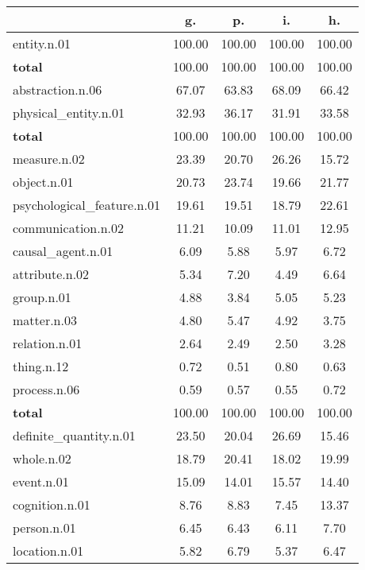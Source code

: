 \begin{table}[h!]
\begin{center}
\begin{tabular}{| l || c | c | c | c |}\hline
 & {\bf g.} & {\bf p.} & {\bf i.} & {\bf h.} \\\hline\hline
entity.n.01 & 100.00  & 100.00  & 100.00  & 100.00 \\\hline\hline
{{\bf total}} & 100.00  & 100.00  & 100.00  & 100.00 \\\hline\hline\hline
abstraction.n.06 & 67.07  & 63.83  & 68.09  & 66.42 \\\hline
physical\_entity.n.01 & 32.93  & 36.17  & 31.91  & 33.58 \\\hline\hline
{{\bf total}} & 100.00  & 100.00  & 100.00  & 100.00 \\\hline\hline\hline
measure.n.02 & 23.39  & 20.70  & 26.26  & 15.72 \\\hline
object.n.01 & 20.73  & 23.74  & 19.66  & 21.77 \\\hline
psychological\_feature.n.01 & 19.61  & 19.51  & 18.79  & 22.61 \\\hline
communication.n.02 & 11.21  & 10.09  & 11.01  & 12.95 \\\hline
causal\_agent.n.01 & 6.09  & 5.88  & 5.97  & 6.72 \\\hline
attribute.n.02 & 5.34  & 7.20  & 4.49  & 6.64 \\\hline
group.n.01 & 4.88  & 3.84  & 5.05  & 5.23 \\\hline
matter.n.03 & 4.80  & 5.47  & 4.92  & 3.75 \\\hline
relation.n.01 & 2.64  & 2.49  & 2.50  & 3.28 \\\hline
thing.n.12 & 0.72  & 0.51  & 0.80  & 0.63 \\\hline
process.n.06 & 0.59  & 0.57  & 0.55  & 0.72 \\\hline\hline
{{\bf total}} & 100.00  & 100.00  & 100.00  & 100.00 \\\hline\hline\hline
definite\_quantity.n.01 & 23.50  & 20.04  & 26.69  & 15.46 \\\hline
whole.n.02 & 18.79  & 20.41  & 18.02  & 19.99 \\\hline
event.n.01 & 15.09  & 14.01  & 15.57  & 14.40 \\\hline
cognition.n.01 & 8.76  & 8.83  & 7.45  & 13.37 \\\hline
person.n.01 & 6.45  & 6.43  & 6.11  & 7.70 \\\hline
location.n.01 & 5.82  & 6.79  & 5.37  & 6.47 \\\hline

\end{tabular}
\end{center}
\end{table}
